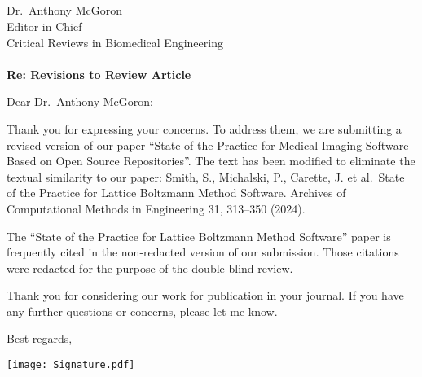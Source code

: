 \documentclass[12pt]{casletter}
\begin{document}
\begin{letter}{~\\
~\\
~\\
~\\
Dr.\ Anthony McGoron\\
Editor-in-Chief\\
Critical Reviews in Biomedical Engineering\\
~\\
{\bf Re: Revisions to Review Article}}

\opening {Dear Dr.\ Anthony McGoron:}

Thank you for expressing your concerns. To address them, we are submitting a
revised version of our paper ``State of the Practice for Medical Imaging
Software Based on Open Source Repositories''.  The text has been modified to
eliminate the textual similarity to our paper: Smith, S., Michalski, P.,
Carette, J. et al.\ State of the Practice for Lattice Boltzmann Method Software.
Archives of Computational Methods in Engineering 31, 313--350 (2024). 

The ``State of the Practice for Lattice Boltzmann Method Software'' paper is
frequently cited in the non-redacted version of our submission. Those citations
were redacted for the purpose of the double blind review.

Thank you for considering our work for publication in your journal.  If you have
any further questions or concerns, please let me know.

\closing{Best regards,~\newline}
\vspace{-29mm}
\texttt{[image: Signature.pdf]}

\end {letter}
\end{document}
